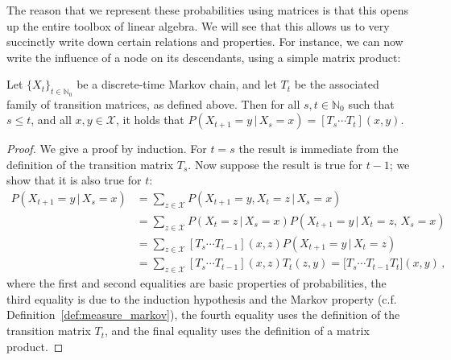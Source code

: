 \documentclass[graybox]{svmult}
\newcommand{\nats}{\mathbb{N}}
\newcommand{\natswith}{\nats_{0}}
\newcommand{\states}{\mathcal{X}}
\begin{document}
The reason that we represent these probabilities using matrices is that this opens up the entire toolbox of linear algebra. We will see that this allows us to very succinctly write down certain relations and properties. For instance, we can now write the influence of a node on its descendants, using a simple matrix product:
\begin{proposition}\label{prop:markov_factor_transmat}
Let $\{X_t\}_{t\in\natswith}$ be a discrete-time Markov chain, and let $T_t$ be the associated family of transition matrices, as defined above. Then for all $s,t\in\natswith$ such that $s\leq t$, and all $x,y\in\states$, it holds that $P(X_{t+1}=y\,\vert\,X_s=x) = \left[T_s\cdots T_{t}\right](x,y)$.
\end{proposition}
\begin{proof}
We give a proof by induction. For $t=s$ the result is immediate from the definition of the transition matrix $T_s$. Now suppose the result is true for $t-1$; we show that it is also true for $t$:
\begin{align*}
P(X_{t+1}=y\,\vert\,X_s=x) &= \sum_{z\in\states} P(X_{t+1}=y,X_{t}=z\,\vert\,X_s=x) \\
 &= \sum_{z\in\states} P(X_{t}=z\,\vert\,X_s=x) P(X_{t+1}=y\,\vert\,X_{t}=z,\,X_s=x) \\
 &= \sum_{z\in\states} \left[T_s\cdots T_{t-1}\right](x,z) P(X_{t+1}=y\,\vert\,X_{t}=z) \\
 &= \sum_{z\in\states} \left[T_s\cdots T_{t-1}\right](x,z) T_{t}(z,y) = \bigl[T_s\cdots T_{t-1}T_{t}\bigr](x,y)\,,
\end{align*}
where the first and second equalities are basic properties of probabilities, the third equality is due to the induction hypothesis and the Markov property (c.f. Definition~\ref{def:measure_markov}), the fourth equality uses the definition of the transition matrix $T_{t}$, and the final equality uses the definition of a matrix product. 
\end{proof}
\end{document}
